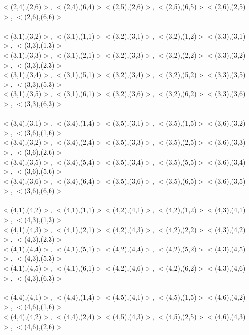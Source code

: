 \documentclass{article}
\begin{document}
\begin{enumerate}
$<$(2,4),(2,6)$>$, $<$(2,4),(6,4)$>$\qquad	$<$(2,5),(2,6)$>$, $<$(2,5),(6,5)$>$\qquad	$<$(2,6),(2,5)$>$, $<$(2,6),(6,6)$>$\\
\\
$<$(3,1),(3,2)$>$, $<$(3,1),(1,1)$>$\qquad	$<$(3,2),(3,1)$>$, $<$(3,2),(1,2)$>$\qquad	$<$(3,3),(3,1)$>$, $<$(3,3),(1,3)$>$\\
$<$(3,1),(3,3)$>$, $<$(3,1),(2,1)$>$\qquad	$<$(3,2),(3,3)$>$, $<$(3,2),(2,2)$>$\qquad	$<$(3,3),(3,2)$>$, $<$(3,3),(2,3)$>$\\
$<$(3,1),(3,4)$>$, $<$(3,1),(5,1)$>$\qquad	$<$(3,2),(3,4)$>$, $<$(3,2),(5,2)$>$\qquad	$<$(3,3),(3,5)$>$, $<$(3,3),(5,3)$>$\\
$<$(3,1),(3,5)$>$, $<$(3,1),(6,1)$>$\qquad	$<$(3,2),(3,6)$>$, $<$(3,2),(6,2)$>$\qquad	$<$(3,3),(3,6)$>$, $<$(3,3),(6,3)$>$\\
\\
$<$(3,4),(3,1)$>$, $<$(3,4),(1,4)$>$\qquad	$<$(3,5),(3,1)$>$, $<$(3,5),(1,5)$>$\qquad	$<$(3,6),(3,2)$>$, $<$(3,6),(1,6)$>$\\
$<$(3,4),(3,2)$>$, $<$(3,4),(2,4)$>$\qquad	$<$(3,5),(3,3)$>$, $<$(3,5),(2,5)$>$\qquad	$<$(3,6),(3,3)$>$, $<$(3,6),(2,6)$>$\\
$<$(3,4),(3,5)$>$, $<$(3,4),(5,4)$>$\qquad	$<$(3,5),(3,4)$>$, $<$(3,5),(5,5)$>$\qquad	$<$(3,6),(3,4)$>$, $<$(3,6),(5,6)$>$\\
$<$(3,4),(3,6)$>$, $<$(3,4),(6,4)$>$\qquad	$<$(3,5),(3,6)$>$, $<$(3,5),(6,5)$>$\qquad	$<$(3,6),(3,5)$>$, $<$(3,6),(6,6)$>$\\
\\
$<$(4,1),(4,2)$>$, $<$(4,1),(1,1)$>$\qquad	$<$(4,2),(4,1)$>$, $<$(4,2),(1,2)$>$\qquad	$<$(4,3),(4,1)$>$, $<$(4,3),(1,3)$>$\\
$<$(4,1),(4,3)$>$, $<$(4,1),(2,1)$>$\qquad	$<$(4,2),(4,3)$>$, $<$(4,2),(2,2)$>$\qquad	$<$(4,3),(4,2)$>$, $<$(4,3),(2,3)$>$\\
$<$(4,1),(4,4)$>$, $<$(4,1),(5,1)$>$\qquad	$<$(4,2),(4,4)$>$, $<$(4,2),(5,2)$>$\qquad	$<$(4,3),(4,5)$>$, $<$(4,3),(5,3)$>$\\
$<$(4,1),(4,5)$>$, $<$(4,1),(6,1)$>$\qquad	$<$(4,2),(4,6)$>$, $<$(4,2),(6,2)$>$\qquad	$<$(4,3),(4,6)$>$, $<$(4,3),(6,3)$>$\\
\\
$<$(4,4),(4,1)$>$, $<$(4,4),(1,4)$>$\qquad	$<$(4,5),(4,1)$>$, $<$(4,5),(1,5)$>$\qquad	$<$(4,6),(4,2)$>$, $<$(4,6),(1,6)$>$\\
$<$(4,4),(4,2)$>$, $<$(4,4),(2,4)$>$\qquad	$<$(4,5),(4,3)$>$, $<$(4,5),(2,5)$>$\qquad	$<$(4,6),(4,3)$>$, $<$(4,6),(2,6)$>$\\

\end{enumerate}
\end{document}
